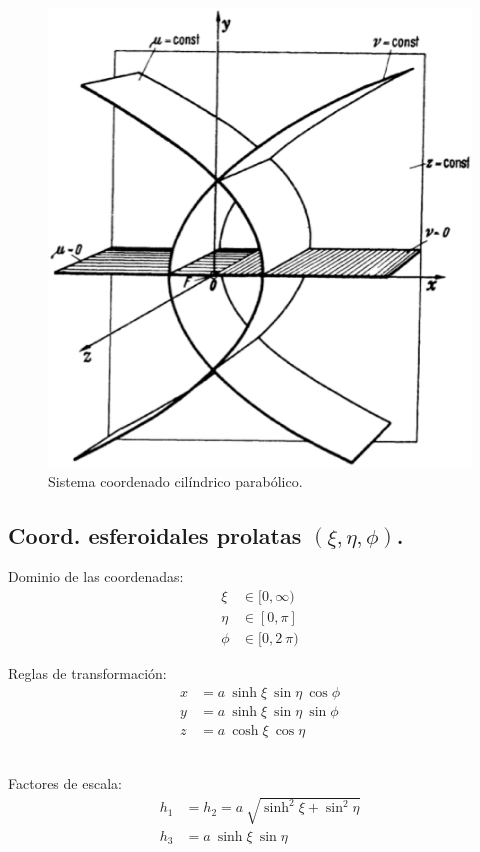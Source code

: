 \begin{figure}[H]
  \centering
  \includegraphics[scale=0.5]{Imagenes/Sistema_Cilindrico_Parabolico.eps}
  \caption{Sistema coordenado cilíndrico parabólico.}
\end{figure}

\subsection{Coord. esferoidales prolatas \texorpdfstring{$(\xi, \eta, \phi)$}{x,e,f}.}

\begin{minipage}{0.45\textwidth}
Dominio de las coordenadas:
\begin{align*}
\xi &\in [0, \infty) \\
\eta &\in [0, \pi] \\
\phi &\in [0, 2 \: \pi)
\end{align*}
\end{minipage}
\hspace{1cm}
\begin{minipage}{0.4\textwidth}
Reglas de transformación:
\begin{align*}
x &= a \: \sinh \xi \: \sin \eta \: \cos \phi\\
y &= a \: \sinh \xi \: \sin \eta \: \sin \phi\\
z &= a \: \cosh \xi \: \cos \eta
\end{align*}
\end{minipage}
\\[0.75em]
Factores de escala:
\begin{align*}
h_{1} &= h_{2} = a \: \sqrt{\sinh^{2} \xi + \sin^{2} \eta} \\
h_{3 }&= a \: \sinh \xi \: \sin \eta
\end{align*}

